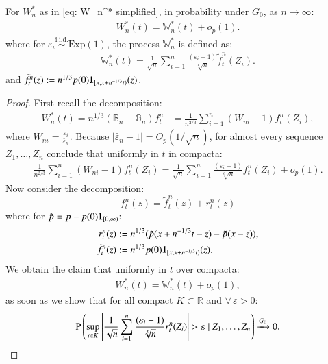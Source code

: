\begin{lemma}\label{lemma: further simplification}
For $W_n^*$ as in \eqref{eq: W_n^* simplified}, in probability under $G_0$, as $n \to \infty$:
\begin{align}\label{eq: W_n^* simplified 1}
	W_n^*(t) = \mathbb{W}_n^*(t) + o_p(1) .
\end{align}
where for \( \varepsilon_i \overset{\text{i.i.d.}}{\sim} \mathrm{Exp}(1) \), the process $\mathbb{W}_n^*$ is defined as:
\begin{align}\label{eq: mathbbW star process 1}
    \mathbb{W}_n^*(t) = \frac{1}{\sqrt{n}} \sum_{i=1}^n \frac{(\varepsilon_i-1)}{\sqrt[6]{n}} \tilde{f}_t^n(Z_i).
\end{align}
and $\tilde{f}_t^n(z) := n^{1/3} p(0) \mathbf{1}_{[x, x+n^{-1/3}t)}(z)$.
\end{lemma}
\begin{proof}
First recall the decomposition:
\begin{align*}
	W_n^*(t) = n^{1/3}(\mathbb{B}_n - \mathbb{G}_n)f_t^n &= \frac{1}{n^{2/3}} \sum_{i=1}^n (W_{ni}-1) f_t^n(Z_i),
\end{align*}
where $W_{ni} = \frac{\varepsilon_i}{\bar{\varepsilon}_n}$. Because $|\bar{\varepsilon}_n - 1| = O_p(1/\sqrt{n})$, for almost every sequence $Z_1, \dots, Z_n$ conclude that uniformly in $t$ in compacta:
\begin{align*}
\frac{1}{n^{2/3}} \sum_{i=1}^n (W_{ni}-1) f_t^n(Z_i) = \frac{1}{\sqrt{n}} \sum_{i=1}^n \frac{(\varepsilon_i-1)}{\sqrt[6]{n}} f_t^n(Z_i) + o_p(1).
\end{align*}
Now consider the decomposition:
\[
f_t^n(z) = \tilde{f}_t^n(z) + r_t^n(z)
\]
where for $\tilde{p} = p - p(0) \mathbf{1}_{[0,\infty)}$:
\begin{align*}
r_t^n(z) &:= n^{1/3} (\tilde{p}(x + n^{-1/3}t - z) - \tilde{p}(x - z)), \\
\tilde{f}_t^n(z) &:= n^{1/3} p(0) \mathbf{1}_{[x, x+n^{-1/3}t)}(z).
\end{align*}
We obtain the claim that uniformly in $t$ over compacta:
\begin{align}
	W_n^*(t) = \mathbb{W}_n^*(t) + o_p(1),
\end{align}
as soon as we show that for all compact $K \subset \mathbb{R}$ and $\forall \, \varepsilon > 0$:
\begin{align}\label{eq: representation without remainders chapter4}
	\mathrm{P} \left( \sup_{t \in K} \left| \frac{1}{\sqrt{n}} \sum_{i=1}^n \frac{(\varepsilon_i-1)}{\sqrt[6]{n}} r_t^n(Z_i) \right| > \varepsilon \mid Z_1, \dots, Z_n \right) \xrightarrow{G_0} 0.
\end{align}


\end{proof}
